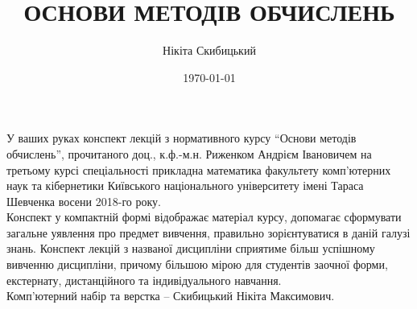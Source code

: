 \documentclass[a4paper, 12pt]{article}
\title{{\Huge ОСНОВИ МЕТОДІВ ОБЧИСЛЕНЬ}}
\author{Нікіта Скибицький}
\date{\today}
\numberwithin{equation}{section}%
\theoremstyle{definition}
\begin{document}
\maketitle \thispagestyle{empty} \newpage 
У ваших руках конспект лекцій з нормативного курсу ``Основи методів обчислень'', прочитаного доц., к.ф.-м.н. Риженком Андрієм Івановичем на третьому курсі спеціальності прикладна математика факультету комп'ютерних наук та кібернетики Київського національного університету імені Тараса Шевченка восени 2018-го року. \\

Конспект у компактній формі відображає матеріал курсу, допомагає сформувати загальне уявлення про предмет вивчення, правильно зорієнтуватися в даній галузі знань. Конспект лекцій з названої дисципліни сприятиме більш успішному вивченню дисципліни, причому більшою мірою для студентів заочної форми, екстернату, дистанційного та індивідуального навчання. \\

Комп'ютерний набір та верстка -- Скибицький Нікіта Максимович. \newpage
\tableofcontents \newpage






\end{document}
